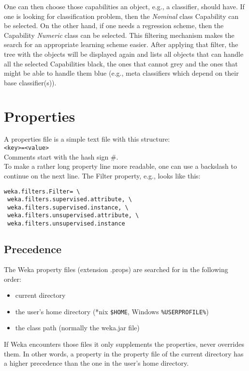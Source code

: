 \noindent One can then choose those capabilities an object, e.g., a
classifier, should have. If one is looking for classification problem,
then the \textit{Nominal} class Capability can be selected. On the other hand,
if one needs a regression scheme, then the Capability \textit{Numeric} class
can be selected. This filtering mechanism makes the search for an
appropriate learning scheme easier. After applying that filter, the
tree with the objects will be displayed again and lists all objects
that can handle all the selected Capabilities black, the ones that
cannot grey and the ones that might be able to handle them blue (e.g.,
meta classifiers which depend on their base classifier(s)).

\section{Properties}
A properties file is a simple text file with this structure:\\

\verb^<key>=<value>^\\

\noindent Comments start with the hash sign \#.\\

\noindent To make a rather long property line more readable, one can
use a backslash to continue on the next line. The Filter property,
e.g., looks like this:

\begin{verbatim}
weka.filters.Filter= \
 weka.filters.supervised.attribute, \
 weka.filters.supervised.instance, \
 weka.filters.unsupervised.attribute, \
 weka.filters.unsupervised.instance
\end{verbatim}

\subsection{Precedence}
The Weka property files (extension .props) are searched for in the following order:

\begin{itemize}
\item current directory
\item the user's home directory (*nix \verb=$HOME=, Windows \verb=%USERPROFILE%=)
\item the class path (normally the weka.jar file) 
\end{itemize}

\noindent If Weka encounters those files it only supplements the
properties, never overrides them. In other words, a property in the
property file of the current directory has a higher precedence than
the one in the user's home directory.\\


